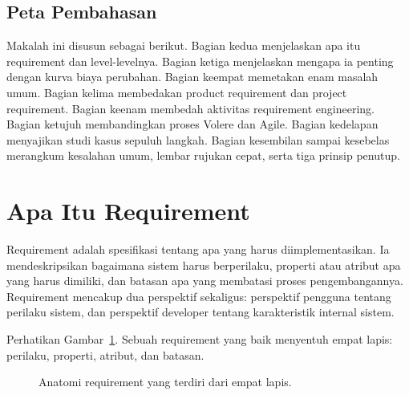 \documentclass[11pt,a4paper]{article}
\begin{document}
\subsection{Peta Pembahasan}

Makalah ini disusun sebagai berikut. Bagian kedua menjelaskan apa itu requirement dan level-levelnya. Bagian ketiga menjelaskan mengapa ia penting dengan kurva biaya perubahan. Bagian keempat memetakan enam masalah umum. Bagian kelima membedakan product requirement dan project requirement. Bagian keenam membedah aktivitas requirement engineering. Bagian ketujuh membandingkan proses Volere dan Agile. Bagian kedelapan menyajikan studi kasus sepuluh langkah. Bagian kesembilan sampai kesebelas merangkum kesalahan umum, lembar rujukan cepat, serta tiga prinsip penutup.

\section{Apa Itu Requirement}

Requirement adalah spesifikasi tentang apa yang harus diimplementasikan. Ia mendeskripsikan bagaimana sistem harus berperilaku, properti atau atribut apa yang harus dimiliki, dan batasan apa yang membatasi proses pengembangannya. Requirement mencakup dua perspektif sekaligus: perspektif pengguna tentang perilaku sistem, dan perspektif developer tentang karakteristik internal sistem.

Perhatikan Gambar~\ref{fig:anatomy-req}. Sebuah requirement yang baik menyentuh empat lapis: perilaku, properti, atribut, dan batasan.

\begin{figure}[H]
	\centering
	\caption{Anatomi requirement yang terdiri dari empat lapis.}
	\label{fig:anatomy-req}
\end{figure}
\end{document}
